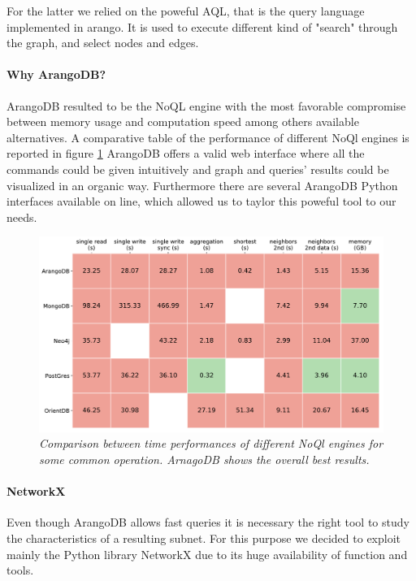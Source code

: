 \documentclass[11pt,twocolumn]{article}
\begin{document}
For the latter we relied on the poweful AQL, that is the query language implemented in arango. It is used to execute different kind of "search" through the graph, and select nodes and edges.

\paragraph{Why ArangoDB?}
ArangoDB resulted to be the NoQL engine with the most favorable compromise between memory usage and computation speed among others available alternatives. A comparative table of the performance of different NoQl engines is reported in figure \ref{fig:tab}
ArangoDB offers a valid web interface where all the commands could be given intuitively and graph and queries' results could be visualized in an organic way.
Furthermore there are several ArangoDB Python interfaces available on line, which allowed us to taylor this poweful tool to our needs.

\begin{figure}[ht!]
\includegraphics[width=\columnwidth]{images/arango_perf.pdf}
\caption{\small{\textit{Comparison between time performances of different NoQl engines for some common operation. ArnagoDB shows the overall best results. }}}
\label{fig:tab}
\end{figure}

\paragraph{NetworkX}
Even though ArangoDB allows fast queries it is necessary the right tool to study the characteristics of a resulting subnet. For this purpose we decided to exploit mainly the Python library NetworkX \cite{WEBSITE:networkx} due to its huge availability of function and tools.
\end{document}
